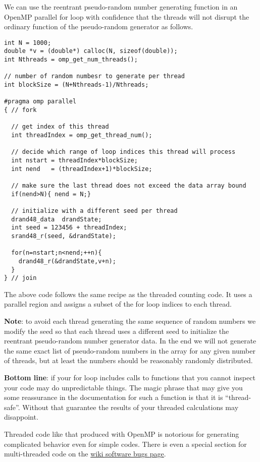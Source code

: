 We can use the reentrant pseudo-random number generating function in an OpenMP parallel for loop with confidence that the threads will not disrupt the ordinary function of the pseudo-random generator as follows.

\begin{verbatim}
int N = 1000;
double *v = (double*) calloc(N, sizeof(double));
int Nthreads = omp_get_num_threads();

// number of random numbesr to generate per thread
int blockSize = (N+Nthreads-1)/Nthreads;

#pragma omp parallel 
{ // fork 

  // get index of this thread
  int threadIndex = omp_get_thread_num();

  // decide which range of loop indices this thread will process
  int nstart = threadIndex*blockSize;
  int nend   = (threadIndex+1)*blockSize;
  
  // make sure the last thread does not exceed the data array bound 
  if(nend>N){ nend = N;}

  // initialize with a different seed per thread
  drand48_data  drandState;
  int seed = 123456 + threadIndex;
  srand48_r(seed, &drandState);

  for(n=nstart;n<nend;++n){
    drand48_r(&drandState,v+n);
  }
} // join 
\end{verbatim}

The above code follows the same recipe as the threaded counting code. It uses a parallel region and assigns a subset of the for loop indices to each thread.

{\bf Note}: to avoid each thread generating the same sequence of random numbers we modify the seed so that each thread uses a different seed to initialize the reentrant pseudo-random number generator data. In the end we will not generate the same exact list of pseudo-random numbers in the array for any given number of threads, but at least the numbers should be reasonably randomly distributed. 

{\bf Bottom line}: if your for loop includes calls to functions that you cannot inspect your code may do unpredictable things. The magic phrase that may give you some reassurance in the documentation for such a function is that it is ``thread-safe''. Without that guarantee the results of your threaded calculations may disappoint. 

Threaded code like that produced with OpenMP is notorious for generating complicated behavior even for simple codes. There is even a special section for multi-threaded code on the \href{https://en.wikipedia.org/wiki/Software_bug#Multi-threading}{wiki software bugs page}.

